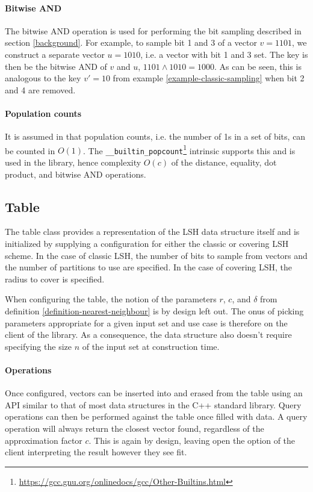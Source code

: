 \paragraph{Bitwise AND} The bitwise AND operation is used for performing the bit sampling described in section \ref{background}. For example, to sample bit 1 and 3 of a vector $v = 1101$, we construct a separate vector $u = 1010$, i.e. a vector with bit 1 and 3 set. The key is then be the bitwise AND of $v$ and $u$, $1101 \wedge 1010 = 1000$. As can be seen, this is analogous to the key $v' = 10$ from example \ref{example-classic-sampling} when bit 2 and 4 are removed.

\paragraph{Population counts} It is assumed in \cite{DBLP:journals/corr/Pagh15} that population counts, i.e. the number of 1s in a set of bits, can be counted in $O(1)$. The \texttt{\_\_builtin\_popcount}\footnote{\url{https://gcc.gnu.org/onlinedocs/gcc/Other-Builtins.html}} intrinsic supports this and is used in the library, hence complexity $O(c)$ of the distance, equality, dot product, and bitwise AND operations.

\subsection{Table}

The table class provides a representation of the LSH data structure itself and is initialized by supplying a configuration for either the classic or covering LSH scheme. In the case of classic LSH, the number of bits to sample from vectors and the number of partitions to use are specified. In the case of covering LSH, the radius to cover is specified.

When configuring the table, the notion of the parameters $r$, $c$, and $\delta$ from definition \ref{definition-nearest-neighbour} is by design left out. The onus of picking parameters appropriate for a given input set and use case is therefore on the client of the library. As a consequence, the data structure also doesn't require specifying the size $n$ of the input set at construction time.

\paragraph{Operations} Once configured, vectors can be inserted into and erased from the table using an API similar to that of most data structures in the C++ standard library. Query operations can then be performed against the table once filled with data. A query operation will always return the closest vector found, regardless of the approximation factor $c$. This is again by design, leaving open the option of the client interpreting the result however they see fit.

